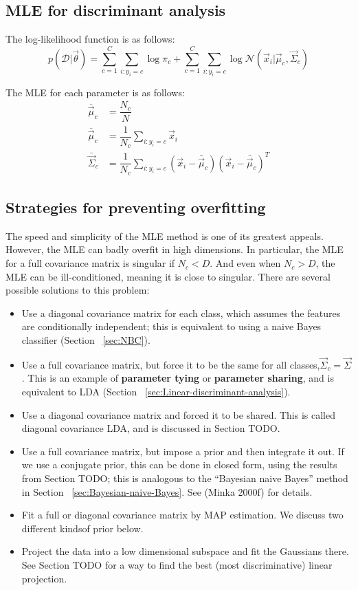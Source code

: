 \subsection{MLE for discriminant analysis}
\label{sec:MLE-for-discriminant-analysis}
The log-likelihood function is as follows:
\begin{equation}
p(\mathcal{D}|\vec{\theta})=\sum\limits_{c=1}^C{\sum\limits_{i:y_i=c}{\log\pi_c}}+\sum\limits_{c=1}^C{\sum\limits_{i:y_i=c}{\log\mathcal{N}(\vec{x}_i|\vec{\mu}_c,\vec{\Sigma}_c)}}
\end{equation}

The MLE for each parameter is as follows:
\begin{align}
\bar{\vec{\mu}}_c& = \dfrac{N_c}{N} \\
\bar{\vec{\mu}}_c& = \dfrac{1}{N_c}\sum\limits_{i:y_i=c}\vec{x}_i \\
\bar{\vec{\Sigma}}_c& = \dfrac{1}{N_c}\sum\limits_{i:y_i=c}(\vec{x}_i-\bar{\vec{\mu}}_c)(\vec{x}_i-\bar{\vec{\mu}}_c)^T
\end{align}


\subsection{Strategies for preventing overfitting}
The speed and simplicity of the MLE method is one of its greatest appeals. However, the MLE can badly overfit in high dimensions. In particular, the MLE for a full covariance matrix is singular if $N_c <D$. And even when $N_c >D$, the MLE can be ill-conditioned, meaning it is close to singular. There are several possible solutions to this problem:
\begin{itemize}
\item{Use a diagonal covariance matrix for each class, which assumes the features are conditionally independent; this is equivalent to using a naive Bayes classifier (Section ~\ref{sec:NBC})}.
\item{Use a full covariance matrix, but force it to be the same for all classes,$\vec{\Sigma}_c=\vec{\Sigma}$. This is an example of \textbf{parameter tying} or \textbf{parameter sharing}, and is equivalent to LDA (Section ~\ref{sec:Linear-discriminant-analysis}).}
\item{Use a diagonal covariance matrix and forced it to be shared. This is called diagonal covariance LDA, and is discussed in Section TODO.}
\item{Use a full covariance matrix, but impose a prior and then integrate it out. If we use a conjugate prior, this can be done in closed form, using the results from Section TODO; this is analogous to the “Bayesian naive Bayes” method in Section ~\ref{sec:Bayesian-naive-Bayes}. See (Minka 2000f) for details.}
\item{Fit a full or diagonal covariance matrix by MAP estimation. We discuss two different kindsof prior below.}
\item{Project the data into a low dimensional subspace and fit the Gaussians there. See Section TODO for a way to find the best (most discriminative) linear projection.}
\end{itemize}

